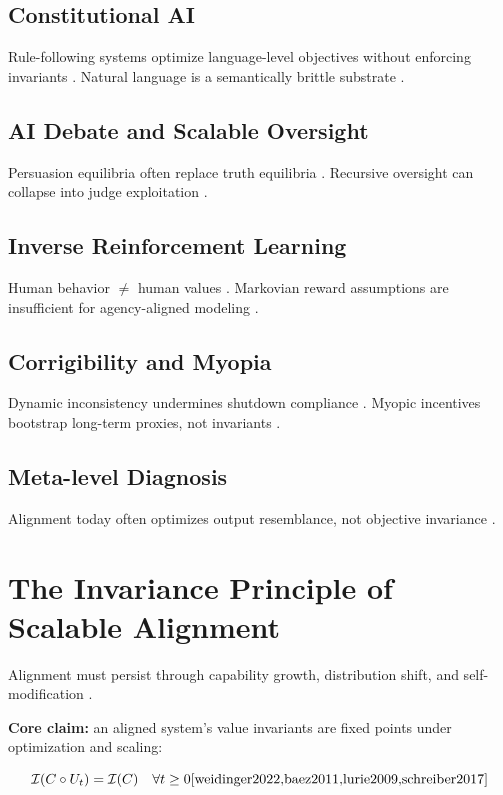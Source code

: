 \documentclass[11pt,a4paper]{article}
\theoremstyle{plain}
\begin{document}
\subsection{Constitutional AI}
Rule-following systems optimize language-level objectives without enforcing invariants \cite{bai2022}. Natural language is a semantically brittle substrate \cite{bai2022,krueger2020}.  

\subsection{AI Debate and Scalable Oversight}
Persuasion equilibria often replace truth equilibria \cite{irving2018,krueger2020}. Recursive oversight can collapse into judge exploitation \cite{irving2018}.

\subsection{Inverse Reinforcement Learning}
Human behavior $\neq$ human values \cite{ng2000}. Markovian reward assumptions are insufficient for agency-aligned modeling \cite{ng2000,soares2015}.

\subsection{Corrigibility and Myopia}
Dynamic inconsistency undermines shutdown compliance \cite{soares2015}. Myopic incentives bootstrap long-term proxies, not invariants \cite{soares2015}.

\subsection{Meta-level Diagnosis}
Alignment today often optimizes output resemblance, not objective invariance \cite{christiano2022,bai2022,ng2000,weidinger2022,olah2020}.

\section{The Invariance Principle of Scalable Alignment}

Alignment must persist through capability growth, distribution shift, and self-modification \cite{weidinger2022,olah2020}.  

\textbf{Core claim:} an aligned system's value invariants are fixed points under optimization and scaling:

\[
\mathcal{I}(C \circ U_t) = \mathcal{I}(C) \quad \forall t \ge 0 \cite{weidinger2022,baez2011,lurie2009,schreiber2017}
\]
\end{document}
